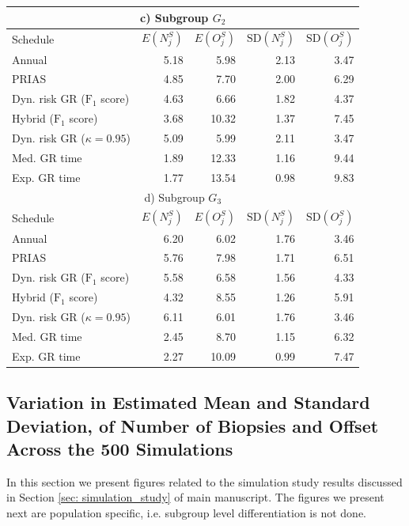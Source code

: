 \begin{table}[!htb]
\begin{tabular}{lrrrr}
\multicolumn{5}{c}{c) Subgroup $G_2$}\\
\hline
Schedule        & $E(N^S_j)$ & $E(O^S_j)$ & ${\mbox{SD}(N^S_j)}$ & ${\mbox{SD}(O^S_j)}$ \\
\hline
Annual         & 5.18            & 5.98                & 2.13          & 3.47              \\
PRIAS          & 4.85            & 7.70                & 2.00          & 6.29        \\
Dyn. risk GR ($\mbox{F}_1$ score)       & 4.63            & 6.66                & 1.82          & 4.37              \\
Hybrid ($\mbox{F}_1$ score)       & 3.68            & 10.32                & 1.37          & 7.45              \\
Dyn. risk GR ($\kappa=0.95$) & 5.09 & 5.99 & 2.11 & 3.47\\
Med. GR time & 1.89             & 12.33               & 1.16          & 9.44              \\
Exp. GR time & 1.77            & 13.54               & 0.98          & 9.83              \\
\hline      
\multicolumn{5}{c}{d) Subgroup $G_3$}\\
\hline
Schedule        & $E(N^S_j)$ & $E(O^S_j)$ & ${\mbox{SD}(N^S_j)}$ & ${\mbox{SD}(O^S_j)}$ \\
\hline
Annual         & 6.20             & 6.02                & 1.76          & 3.46              \\
PRIAS          & 5.76             & 7.98                & 1.71         & 6.51        \\
Dyn. risk GR ($\mbox{F}_1$ score)       & 5.58            & 6.58                & 1.56          & 4.33              \\
Hybrid ($\mbox{F}_1$ score)       & 4.32            & 8.55                & 1.26          & 5.91              \\
Dyn. risk GR ($\kappa=0.95$) & 6.11 & 6.01 & 1.76 & 3.46\\
Med. GR time & 2.45            & 8.70                & 1.15          & 6.32              \\
Exp. GR time & 2.27            & 10.09               & 0.99          & 7.47              \\
\hline     
\end{tabular}
\end{table}

\clearpage

\subsection{Variation in Estimated Mean and Standard Deviation, of Number of Biopsies and Offset Across the 500 Simulations}
In this section we present figures related to the simulation study results discussed in Section \ref{sec: simulation_study} of main manuscript. The figures we present next are population specific, i.e. subgroup level differentiation is not done.

